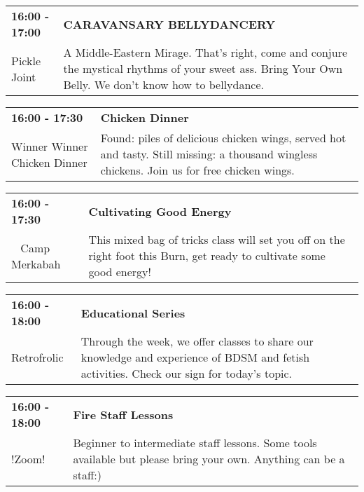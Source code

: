 \begin{tabular}{ p{1in} p{2.2in} }
    \textbf{16:00 - 17:00} & \textbf{CARAVANSARY BELLYDANCERY} \\
    Pickle Joint \newline  & A Middle-Eastern Mirage. That's right, come and conjure the mystical rhythms of your sweet ass. Bring Your Own Belly. We don't know how to bellydance. \\
    \hline 
\end{tabular}
    
\begin{tabular}{ p{1in} p{2.2in} }
    \textbf{16:00 - 17:30} & \textbf{Chicken Dinner} \\
    Winner Winner Chicken Dinner \newline  & Found: piles of delicious chicken wings, served hot and tasty. Still missing: a thousand wingless chickens. Join us for free chicken wings. \\
    \hline 
\end{tabular}
    
\begin{tabular}{ p{1in} p{2.2in} }
    \textbf{16:00 - 17:30} & \textbf{Cultivating Good Energy} \\
    ~ \newline Camp Merkabah & This mixed bag of tricks class will set you off on the right foot this Burn, get ready to cultivate some good energy! \\
    \hline 
\end{tabular}
    
\begin{tabular}{ p{1in} p{2.2in} }
    \textbf{16:00 - 18:00} & \textbf{Educational Series} \\
    Retrofrolic \newline  & Through the week, we offer classes to share our knowledge and experience of BDSM and fetish activities.  Check our sign for today's topic. \\
    \hline 
\end{tabular}
    
\begin{tabular}{ p{1in} p{2.2in} }
    \textbf{16:00 - 18:00} & \textbf{Fire Staff Lessons} \\
    !Zoom! \newline  & Beginner to intermediate staff lessons.  Some tools available but please bring your own.  Anything can be a staff:) \\
    \hline 
\end{tabular}
    
